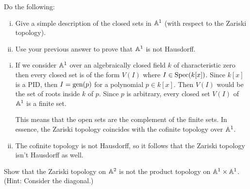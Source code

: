 \documentclass[12pt]{memoir}
\begin{document}

\begin{Ej}
  Do the following:
  \begin{enumerate}[i)]
    \itemsep=-0.4em
    \item Give a simple description of the closed sets in $\mathbb{A}^1$ (with respect to the Zariski
    topology).
    \item Use your previous answer to prove that $\mathbb{A}^1$ is not Hausdorff.
  \end{enumerate}
\end{Ej}

\begin{ptcbr}
\begin{enumerate}[i)]
  \itemsep=-0.4em
    \item If we consider $\mathbb{A}^1$ over an algebraically closed field $k$ of characteristic zero then every closed set is of the form $V(I)$ where $I\in\operatorname{Spec}(k[x])$. Since $k[x]$ is a PID, then $I=\operatorname{gen}(p)$ for a polynomial $p\in k[x]$. Then $V(I)$ would be the set of roots inside $k$ of $p$. Since $p$ is arbitrary, every closed set $V(I)$ of $\mathbb{A}^1$ is a finite set.\par 
    This means that the open sets are the complement of the finite sets. In essence, the Zariski topology coincides with the cofinite topology over $\mathbb{A}^1$.
    \item The cofinite topology is not Hausdorff, so it follows that the Zariski topology isn't Hausdorff as well.
\end{enumerate}
\end{ptcbr}

\begin{Ej}
  Show that the Zariski topology on $\mathbb{A}^2$ is not the product topology on $\mathbb{A}^1\times\mathbb{A}^1$. (Hint: Consider the diagonal.)
\end{Ej}

\end{document}
